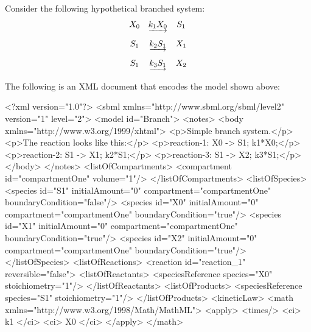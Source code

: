\documentclass[10pt,twocolumntoc]{cekarticle}
\begin{document}
Consider the following hypothetical branched system:
\begin{equation*}
  \begin{array}{@{}ccc@{}}
    X_0 & \underrightarrow{k_1 X_0} & S_1 \\ \\[-4pt]
    S_1 & \underrightarrow{k_2 S_1} & X_1 \\ \\[-4pt]
    S_1 & \underrightarrow{k_3 S_1} & X_2
  \end{array}
\end{equation*}

The following is an XML document that encodes the model shown
above:

\begin{example}
<?xml version="1.0"?>
<sbml xmlns="http://www.sbml.org/sbml/level2" version="1" level="2">
    <model id="Branch">
        <notes>
            <body xmlns="http://www.w3.org/1999/xhtml">
                <p>Simple branch system.</p>
                <p>The reaction looks like this:</p>
                <p>reaction-1:   X0 -> S1; k1*X0;</p>
                <p>reaction-2:   S1 -> X1; k2*S1;</p>
                <p>reaction-3:   S1 -> X2; k3*S1;</p>
            </body>
        </notes>
        <listOfCompartments>
            <compartment id="compartmentOne" volume="1"/>
        </listOfCompartments>
        <listOfSpecies>
            <species id="S1" initialAmount="0" compartment="compartmentOne"
                     boundaryCondition="false"/>
            <species id="X0" initialAmount="0" compartment="compartmentOne"
                     boundaryCondition="true"/>
            <species id="X1" initialAmount="0" compartment="compartmentOne"
                     boundaryCondition="true"/>
            <species id="X2" initialAmount="0" compartment="compartmentOne"
                     boundaryCondition="true"/>
        </listOfSpecies>
        <listOfReactions>
            <reaction id="reaction_1" reversible="false">
                <listOfReactants>
                    <speciesReference species="X0" stoichiometry="1"/>
                </listOfReactants>
                <listOfProducts>
                    <speciesReference species="S1" stoichiometry="1"/>
                </listOfProducts>
                <kineticLaw>
                    <math xmlns="http://www.w3.org/1998/Math/MathML">
                        <apply>
                            <times/>
                            <ci> k1 </ci>
                            <ci> X0 </ci>
                        </apply>
                    </math>

\end{example}
\end{document}
